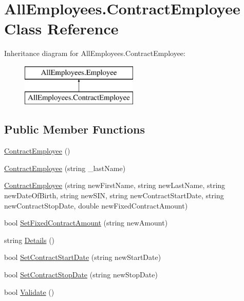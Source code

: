 \hypertarget{class_all_employees_1_1_contract_employee}{}\section{All\+Employees.\+Contract\+Employee Class Reference}
\label{class_all_employees_1_1_contract_employee}
Inheritance diagram for All\+Employees.\+Contract\+Employee\+:\begin{figure}[H]
\begin{center}
\leavevmode
\includegraphics[height=2.000000cm]{class_all_employees_1_1_contract_employee}
\end{center}
\end{figure}
\subsection*{Public Member Functions}
\begin{DoxyCompactItemize}
\item 
\hyperlink{class_all_employees_1_1_contract_employee_afb78892e913ff2a34aed4d7b78d6c9f7}{Contract\+Employee} ()
\item 
\hyperlink{class_all_employees_1_1_contract_employee_aa4e0d47c12fc838bbf4bf0e6776dc8a2}{Contract\+Employee} (string \+\_\+last\+Name)
\item 
\hyperlink{class_all_employees_1_1_contract_employee_acd3a7cf2aa473e4fe87195d305e12961}{Contract\+Employee} (string new\+First\+Name, string new\+Last\+Name, string new\+Date\+Of\+Birth, string new\+S\+I\+N, string new\+Contract\+Start\+Date, string new\+Contract\+Stop\+Date, double new\+Fixed\+Contract\+Amount)
\item 
bool \hyperlink{class_all_employees_1_1_contract_employee_a98f6c0c7fd5cb8dd5b5b08c0e510cc4e}{Set\+Fixed\+Contract\+Amount} (string new\+Amount)
\item 
string \hyperlink{class_all_employees_1_1_contract_employee_adc3a5e1e3280ac1ec77d1a0767b95c19}{Details} ()
\item 
bool \hyperlink{class_all_employees_1_1_contract_employee_a3bb5553c2849c0330e221fff99ac8cf4}{Set\+Contract\+Start\+Date} (string new\+Start\+Date)
\item 
bool \hyperlink{class_all_employees_1_1_contract_employee_a2b3037837e36e0cc455f16d3478bdae7}{Set\+Contract\+Stop\+Date} (string new\+Stop\+Date)
\item 
bool \hyperlink{class_all_employees_1_1_contract_employee_a826e3f824d86fb6b4cd1c527350c5b3a}{Validate} ()
\end{DoxyCompactItemize}

